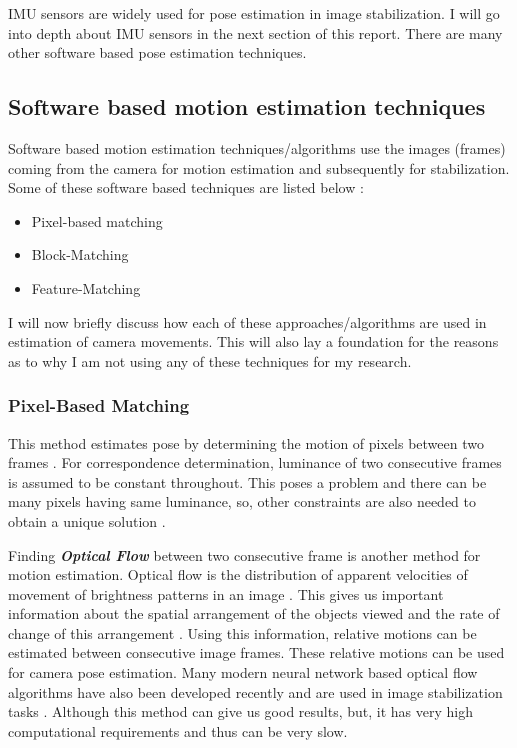 IMU sensors are widely used for pose estimation in image stabilization. I will go into depth about IMU sensors in the next section of this report. There are many other software based pose estimation techniques. 

\subsection{Software based motion estimation techniques}

Software based motion estimation techniques/algorithms use the images (frames) coming from the camera for motion estimation and subsequently for stabilization. Some of these software based techniques are listed below \citep{dis_review}:

\begin{itemize}
\item Pixel-based matching
\item Block-Matching
\item Feature-Matching
\end{itemize}

I will now briefly discuss how each of these approaches/algorithms are used in estimation of camera movements. This will also lay a foundation for the reasons as to why I am not using any of these techniques for my research.

\subsubsection{Pixel-Based Matching}
This method estimates pose by determining the motion of pixels between two frames \citep{dis_review}. For correspondence determination, luminance of two consecutive frames is assumed to be constant throughout. This poses a problem and there can be many pixels having same luminance, so, other constraints are also needed to obtain a unique solution \citep{dis_review}. 

Finding  \textbf{\textit{Optical Flow}} between two consecutive frame is another method for motion estimation. Optical flow is the distribution of apparent velocities of movement of brightness patterns in an image \citep{horn1981determining}. This gives us important information about the spatial arrangement of the objects viewed and the rate of change of this arrangement \citep{gibson1977analysis}. Using this information, relative motions can be estimated between consecutive image frames. These relative motions can be used for camera pose estimation. Many modern neural network based optical flow algorithms have also been developed recently and are used in image stabilization tasks \citep{deep_opti_stab}. Although this method can give us good results, but, it has very high computational requirements and thus can be very slow.

